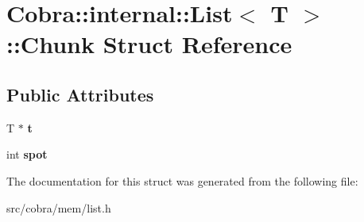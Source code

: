 \hypertarget{struct_cobra_1_1internal_1_1_list_1_1_chunk}{\section{Cobra\+:\+:internal\+:\+:List$<$ T $>$\+:\+:Chunk Struct Reference}
\label{struct_cobra_1_1internal_1_1_list_1_1_chunk}
}
\subsection*{Public Attributes}
\begin{DoxyCompactItemize}
\item 
\hypertarget{struct_cobra_1_1internal_1_1_list_1_1_chunk_aa22fa3fdc03f19d0fe49a6890eb4a15d}{T $\ast$ {\bfseries t}}\label{struct_cobra_1_1internal_1_1_list_1_1_chunk_aa22fa3fdc03f19d0fe49a6890eb4a15d}

\item 
\hypertarget{struct_cobra_1_1internal_1_1_list_1_1_chunk_a2530f113513fa9a824de46028470c828}{int {\bfseries spot}}\label{struct_cobra_1_1internal_1_1_list_1_1_chunk_a2530f113513fa9a824de46028470c828}

\end{DoxyCompactItemize}


The documentation for this struct was generated from the following file\+:\begin{DoxyCompactItemize}
\item 
src/cobra/mem/list.\+h\end{DoxyCompactItemize}
